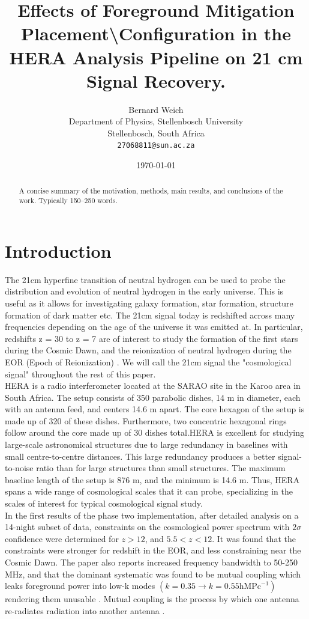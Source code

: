 \documentclass[11pt,a4paper]{article}
\title{\textbf{Effects of Foreground Mitigation Placement\textbackslash Configuration in the HERA Analysis Pipeline on 21 cm Signal Recovery.}}
\author{
    Bernard Weich\\
    Department of Physics, Stellenbosch University\\
    Stellenbosch, South Africa\\
    \texttt{27068811@sun.ac.za}
}
\date{\today}
\begin{document}
\maketitle

\begin{abstract}
A concise summary of the motivation, methods,
main results, and conclusions of the work.
Typically 150--250 words.
\end{abstract}

\section{Introduction}

The 21cm hyperfine transition of neutral hydrogen can be used to probe the distribution and evolution of neutral hydrogen in the early universe. This is useful as it allows for investigating galaxy formation, star formation, structure formation of dark matter etc. The 21cm signal today is redshifted across many frequencies depending on the age of the universe it was emitted at. In particular, redshifts z = 30 to z = 7 are of interest to study the formation of the first stars during the Cosmic Dawn, and the reionization of neutral hydrogen during the EOR (Epoch of Reionization) \parencite{BARKANA2001125}. We will call the 21cm signal the "cosmological signal" throughout the rest of this paper.\\

HERA is a radio interferometer located at the SARAO site in the Karoo area in South Africa. The setup consists of 350 parabolic dishes, 14 m in diameter, each with an antenna feed, and centers 14.6 m apart. The core hexagon of the setup is made up of 320 of these dishes. Furthermore, two concentric hexagonal rings follow around the core made up of 30 dishes total.HERA is excellent for studying large-scale astronomical structures due to large redundancy in baselines with small centre-to-centre distances. This large redundancy produces a better signal-to-noise ratio than for large structures than small structures. The maximum baseline length of the setup is 876 m, and the minimum is 14.6 m. Thus, HERA spans a wide range of cosmological scales that it can probe, specializing in the scales of interest for typical cosmological signal study.\\

In the first results of the phase two implementation, after detailed analysis on a 14-night subset of data, constraints on the cosmological power spectrum with \(2\sigma\) confidence were determined for \(z > 12\), and \(5.5 < z < 12\). It was found that the constraints were stronger for redshift in the EOR, and less constraining near the Cosmic Dawn. The paper also reports increased frequency bandwidth to 50-250 MHz, and that the dominant systematic was found to be mutual coupling which leaks foreground power into low-k modes \((k=0.35 \longrightarrow k=0.55 \text{hMPc}^{-1})\) rendering them unusable \parencite{Abdurashidova_2026}. Mutual coupling is the process by which one antenna re-radiates radiation into another antenna \parencite{camps1998}. \\
\end{document}
